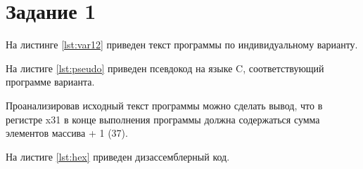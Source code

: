 \chapter{Задание 1}

На листинге \ref{lst:var12} приведен текст программы по индивидуальному
варианту.


На листиге \ref{lst:pseudo} приведен псевдокод на языке C, соответствующий
программе варианта.


Проанализировав исходный текст программы можно сделать вывод, что в регистре
x31 в конце выполнения программы должна содержаться сумма элементов массива + 1
(37).

На листиге \ref{lst:hex} приведен дизассемблерный код.

